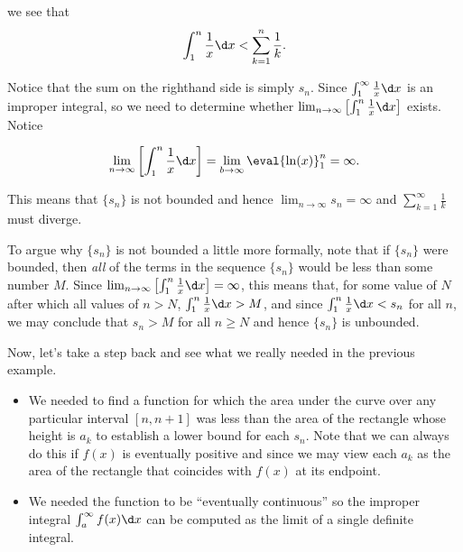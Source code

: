 \documentclass{ximera}
\begin{document}
\begin{model}
\begin{image}
\end{image}
we see that
\[
\int_1^n \frac{1}{x} \d x < \sum_{k=1}^n \frac{1}{k}.
\]

Notice that the sum on the righthand side is simply $s_n$.  Since $\int_1^{\infty} \frac{1}{x} \d x$ is an improper integral, so we need to determine whether $\lim_{n \to \infty} \left[ \int_1^n \frac{1}{x} \d x \right]$ exists.  Notice

\[
\lim_{n \to \infty} \left[ \int_1^n \frac{1}{x} \d x \right] = \lim_{b \to \infty} \eval{\ln(x)}_1^n = \infty. 
\]

This means that $\{s_n\}$ is not bounded and hence $\lim_{n \to \infty} s_n = \infty$ and $\sum_{k=1}^{\infty} \frac{1}{k}$ must diverge.  

\begin{remark}
To argue why $\{s_n\}$ is not bounded a little more formally, note that if $\{s_n\}$ were bounded, then \emph{all} of the terms in the sequence $\{s_n\}$ would be less than some number $M$.  Since $\lim_{n \to \infty} \left[ \int_1^n \frac{1}{x} \d x \right] =  \infty$, this means that, for some value of $N$ after which all values of $n>N$, $ \int_1^n \frac{1}{x} \d x > M$, and since $\int_1^n \frac{1}{x} \d x < s_n$ for all $n$, we may conclude that $s_n >M$ for all $n\geq N$ and hence $\{s_n\}$ is unbounded.
\end{remark}

\end{model}

Now, let's take a step back and see what we really needed in the previous example.

\begin{itemize}
\item We needed to find a function for which the area under the curve over any particular interval $[n,n+1]$ was less than the area of the rectangle whose height is $a_k$ to establish a lower bound for each $s_n$.  Note that we can always do this if $f(x)$ is eventually positive and  since we may view each $a_k$ as the area of the rectangle that coincides with $f(x)$ at its  endpoint.
\item We needed the function to be ``eventually continuous'' so the improper integral $\int_{a}^{\infty} f(x) \d x$ can be computed as the limit of a single definite integral.
\end{itemize}
\end{document}
